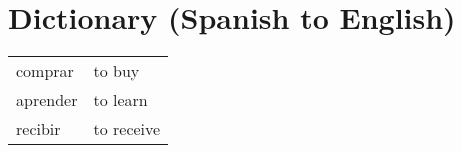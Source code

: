 \chapter{Dictionary \small{(Spanish to English)}}

    \begin{tabular}{ll}
        comprar & to buy \\
        aprender & to learn \\
        recibir & to receive \\
    \end{tabular}
